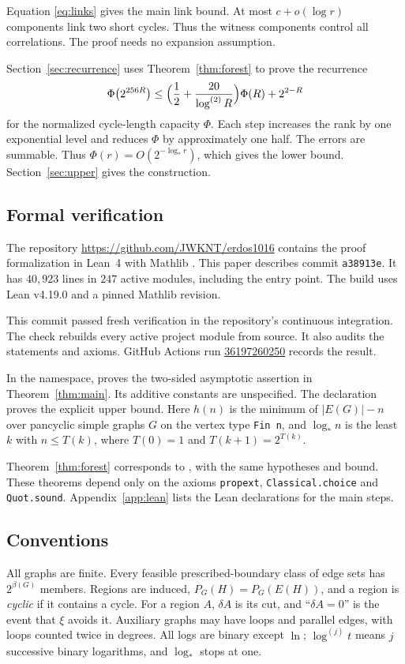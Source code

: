 \documentclass[11pt,a4paper]{article}
\numberwithin{equation}{section}
\theoremstyle{definition}
\theoremstyle{remark}
\newcommand{\lstar}{\log_*}
\begin{document}
Equation \eqref{eq:links} gives the main link bound. At most $c+o(\log r)$ components link two short cycles. Thus the witness components control all correlations. The proof needs no expansion assumption.

Section~\ref{sec:recurrence} uses Theorem~\ref{thm:forest} to prove the recurrence
\[
 \Phi\bigl(2^{256R}\bigr)\le\Bigl(\frac12+\frac{20}{\log^{(2)}R}\Bigr)\Phi(R)+2^{2-R}
\]
for the normalized cycle-length capacity $\Phi$. Each step increases the rank by one exponential level and reduces $\Phi$ by approximately one half. The errors are summable. Thus $\Phi(r)=O(2^{-\lstar r})$, which gives the lower bound. Section~\ref{sec:upper} gives the construction.

\subsection{Formal verification}\label{sec:lean}
The repository \url{https://github.com/JWKNT/erdos1016} contains the proof formalization in Lean~4 \cite{Lean4} with Mathlib \cite{Mathlib}. This paper describes commit \texttt{a38913e}. It has $40{,}923$ lines in $247$ active modules, including the entry point. The build uses Lean v4.19.0 and a pinned Mathlib revision.

This commit passed fresh verification in the repository's continuous integration. The check rebuilds every active project module from source. It also audits the statements and axioms. GitHub Actions run \href{https://github.com/JWKNT/erdos1016/actions/runs/36197260250}{36197260250} records the result.

In the  namespace,  proves the two-sided asymptotic assertion in Theorem~\ref{thm:main}. Its additive constants are unspecified. The declaration  proves the explicit upper bound. Here $h(n)$ is the minimum of $|E(G)|-n$ over pancyclic simple graphs $G$ on the vertex type \texttt{Fin n}, and $\lstar n$ is the least $k$ with $n\le T(k)$, where $T(0)=1$ and $T(k+1)=2^{T(k)}$.

Theorem~\ref{thm:forest} corresponds to , with the same hypotheses and bound. These theorems depend only on the axioms \texttt{propext}, \texttt{Classical.choice} and \texttt{Quot.sound}. Appendix~\ref{app:lean} lists the Lean declarations for the main steps.

\subsection{Conventions}\label{sec:notation}
All graphs are finite. Every feasible prescribed-boundary class of edge sets has $2^{\beta(G)}$ members. Regions are induced, $P_G(H)=P_G(E(H))$, and a region is \emph{cyclic} if it contains a cycle. For a region $A$, $\delta A$ is its cut, and ``$\delta A=0$'' is the event that $\xi$ avoids it. Auxiliary graphs may have loops and parallel edges, with loops counted twice in degrees. All logs are binary except $\ln$; $\log^{(j)}t$ means $j$ successive binary logarithms, and $\lstar$ stops at one.
\end{document}
